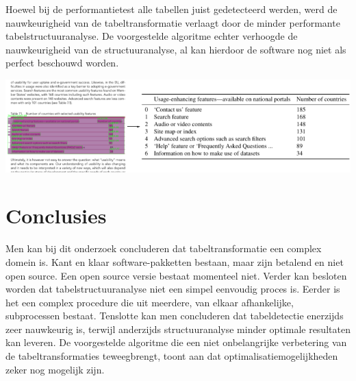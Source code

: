 \documentclass[a0,portrait]{a0poster}
\begin{document}
\begin{multicols}{2}
\noindent Hoewel bij de performantietest alle tabellen juist gedetecteerd werden, werd de nauwkeurigheid van de tabeltransformatie verlaagt door de minder performante tabelstructuuranalyse. De voorgestelde algoritme echter verhoogde de nauwkeurigheid van de structuuranalyse, al kan hierdoor de software nog niet als perfect beschouwd worden.

\begin{center}\vspace{1cm}
\includegraphics[width=1.0\linewidth]{resultaat_voorbeeld_proof_of_concept.png}
\end{center}\vspace{1cm}

\color{HoGentAccent1} 
\section*{Conclusies}
\color{black}
Men kan bij dit onderzoek concluderen dat tabeltransformatie een complex domein is. Kant en klaar software-pakketten bestaan, maar zijn betalend en niet open source. Een open source versie bestaat momenteel niet. Verder kan besloten worden dat tabelstructuuranalyse niet een simpel eenvoudig proces is. Eerder is het een complex procedure die uit meerdere, van elkaar afhankelijke, subprocessen bestaat. Tenslotte kan men concluderen dat tabeldetectie enerzijds zeer nauwkeurig is, terwijl anderzijds structuuranalyse minder optimale resultaten kan leveren. De voorgestelde algoritme die een niet onbelangrijke verbetering van de tabeltransformaties teweegbrengt, toont aan dat optimalisatiemogelijkheden zeker nog mogelijk zijn.
\color{HoGentAccent1} 
\end{multicols}
\end{document}
